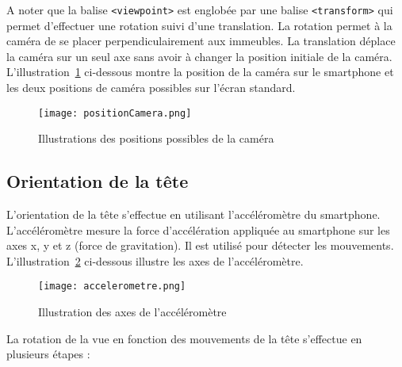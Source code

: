 A noter que la balise \texttt{<viewpoint>} est englobée par une balise \texttt{<transform>} qui permet d'effectuer une rotation suivi d'une translation. La rotation permet à la caméra de se placer perpendiculairement aux immeubles. La translation déplace la caméra sur un seul axe sans avoir à changer la position initiale de la caméra. \\ 

L'illustration~\ref{positionsCamera} ci-dessous montre la position de la caméra sur le \textsf{smartphone} et les deux positions de caméra possibles sur l'écran standard.
\begin{figure}[H]
\centering
\texttt{[image: positionCamera.png]}
\caption{\label{positionsCamera} Illustrations des positions possibles de la caméra}
\end{figure}

\pagebreak
\subsection*{Orientation de la tête}  \label{orientation}
L'orientation de la tête s'effectue en utilisant l'accéléromètre du \textsf{smartphone}. L'accéléromètre mesure la force d'accélération appliquée au \textsf{smartphone} sur les axes x, y et z (force de gravitation). Il est utilisé pour détecter les mouvements. L'illustration~\ref{accelerometre} ci-dessous illustre les axes de l'accéléromètre.
\begin{figure}[H]
\centering
\texttt{[image: accelerometre.png]}
\caption{\label{accelerometre} Illustration des axes de l'accéléromètre}
\end{figure} 

La rotation de la vue en fonction des mouvements de la tête s'effectue en plusieurs étapes :

